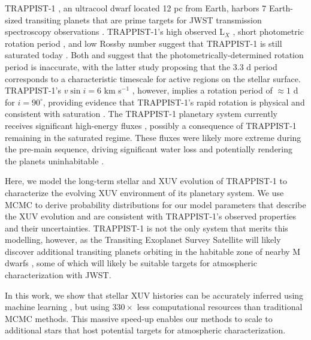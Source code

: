 \documentclass[twocolumn]{aastex62}
\def\lsim{~\rlap{$<$}{\lower 1.0ex\hbox{$\sim$}}}
\newcommand{\approxposterior}[0]{\texttt{approxposterior}\xspace}
\begin{document}
TRAPPIST-1 \citep{Gillon2016,Gillon2017}, an ultracool dwarf located 12 pc from Earth, harbors 7 Earth-sized transiting planets that are prime targets for JWST transmission spectroscopy observations \citep{Morley2017,Lincowski2018,Lustig2019}. TRAPPIST-1's high observed L$_{X}$ \citep{Wheatley2017}, short photometric rotation period \citep[3.3 d, ][]{Luger2017}, and low Rossby number \citep[Ro $\approx 0.01$, ][]{Roettenbacher2017} suggest that TRAPPIST-1 is still saturated today \citep{Pizzolato2003,Wright2011,Wright2018}. Both \citet{Roettenbacher2017} and \citet{Morris2018} suggest that the photometrically-determined rotation period is inaccurate, with the latter study proposing that the 3.3 d period corresponds to a characteristic timescale for active regions on the stellar surface. TRAPPIST-1's $v \sin i = 6$ km s$^{-1}$ \citep{Barnes2014}, however, implies a rotation period of $\approx 1$ d for $i = 90^{\circ}$, providing evidence that TRAPPIST-1's rapid rotation is physical and consistent with saturation \citep[$P_{rot} \lsim 20$ d,][]{Wright2018}. The TRAPPIST-1 planetary system currently receives significant high-energy fluxes \citep{Bourrier2017b,Wheatley2017,Peacock2019}, possibly a consequence of TRAPPIST-1 remaining in the saturated regime. These fluxes were likely more extreme during the pre-main sequence, driving significant water loss and potentially rendering the planets uninhabitable \citep{Bolmont2017,Bourrier2017a}. 

Here, we model the long-term stellar and XUV evolution of TRAPPIST-1 to characterize the evolving XUV environment of its planetary system. We use MCMC to derive probability distributions for our model parameters that describe the XUV evolution and are consistent with TRAPPIST-1's observed properties and their uncertainties. TRAPPIST-1 is not the only system that merits this modelling, however, as the Transiting Exoplanet Survey Satellite will likely discover additional transiting planets orbiting in the habitable zone of nearby M dwarfs \citep{Barclay2018}, some of which will likely be suitable targets for atmospheric characterization with JWST. 

In this work, we show that stellar XUV histories can be accurately inferred using machine learning \citep[\approxposterior, ][]{FlemingVanderPlas2018}, but using $330\times$ less computational resources than traditional MCMC methods. This massive speed-up enables our methods to scale to additional stars that host potential targets for atmospheric characterization. 
\end{document}
